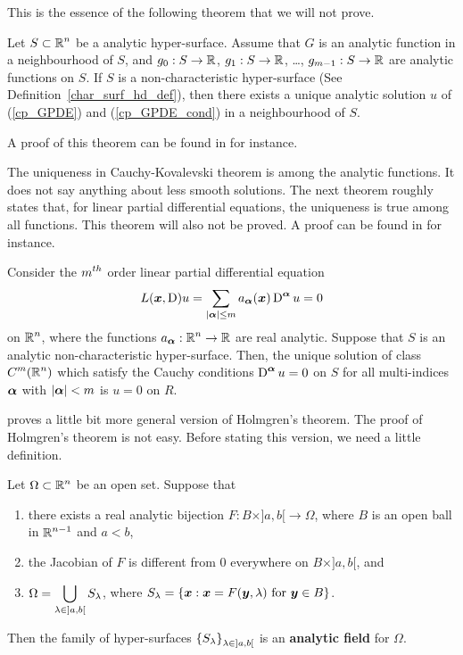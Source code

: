 This is the essence of the following theorem that we will not prove.

\begin{theorem} \label{cauchyKovalTh}
Let $\displaystyle S \subset \mathbb{R}^n$ be a analytic hyper-surface.  Assume that
$G$ is an analytic function in a neighbourhood of $S$, and
$g_0:S\rightarrow \mathbb{R}$, $g_1:S\rightarrow \mathbb{R}$, \ldots, 
$g_{m-1}:S\rightarrow \mathbb{R}$ are analytic functions on $S$.
If $S$ is a non-characteristic hyper-surface
(See Definition~\ref{char_surf_hd_def}),
then there exists a unique analytic solution $u$ of (\ref{cp_GPDE}) and
(\ref{cp_GPDE_cond}) in a neighbourhood of $S$.
\end{theorem}

A proof of this theorem can be found in \cite{J,Tr} for instance.

The uniqueness in Cauchy-Kovalevski theorem is among the analytic
functions.  It does not say anything about less smooth solutions.
The next theorem roughly states that, for linear partial differential
equations, the uniqueness is true among all functions.  This theorem
will also not be proved.  A proof can be found in \cite{Smo} for
instance.

\begin{theorem}[Holmgren] \label{HolmgrenTheo}
Consider the $\displaystyle m^{th}$ order linear partial differential equation
\[
L({\bm{x}}, \operatorname{D})u = \sum_{|{\bm{\alpha}}|\leq m}
a_{{\bm{\alpha}}}({\bm{x}}) \operatorname{D}^{{\bm{\alpha}}} u = 0
\]
on $\displaystyle \mathbb{R}^n$, where the functions
$\displaystyle a_{{\bm{\alpha}}}:\mathbb{R}^n \rightarrow \mathbb{R}$
are real analytic. Suppose that $S$ is an analytic non-characteristic
hyper-surface.  Then, the unique solution of class $\displaystyle C^m(\mathbb{R}^n)$
which satisfy the Cauchy conditions
$\displaystyle \operatorname{D}^{{\bm{\alpha}}} u = 0$
on $S$ for all multi-indices ${\bm{\alpha}}$ with
$|{\bm{\alpha}}|<m$ is $u=0$ on $R$.
\end{theorem}

\cite{J} proves a little bit more general version of Holmgren's theorem.
The proof of Holmgren's theorem is not easy.
Before stating this version, we need a little definition.

\begin{defn}
Let $\displaystyle \Omega \subset \mathbb{R}^n$ be an open set.  Suppose that
\begin{enumerate}
\item there exists a real analytic bijection
$F:B \times ]a,b[ \rightarrow \Omega$, where $B$ is an open ball in
$\displaystyle \mathbb{R}^{n-1}$ and $a<b$,
\item the Jacobian of $F$ is different from $0$ everywhere on
$B\times ]a,b[$, and
\item $\displaystyle \Omega = \bigcup_{\lambda \in ]a,b[} S_\lambda$, 
where $\displaystyle S_\lambda = \left\{ {\bm{x}} : {\bm{x}} = F({\bm{y}},\lambda)
\ \text{for} \ {\bm{y}} \in B \right\}$.
\end{enumerate}
Then the family of hyper-surfaces
$\displaystyle \left\{ S_\lambda \right\}_{\lambda \in ]a,b[}$ is an
{\bfseries analytic field} for $\Omega$.
\end{defn}

